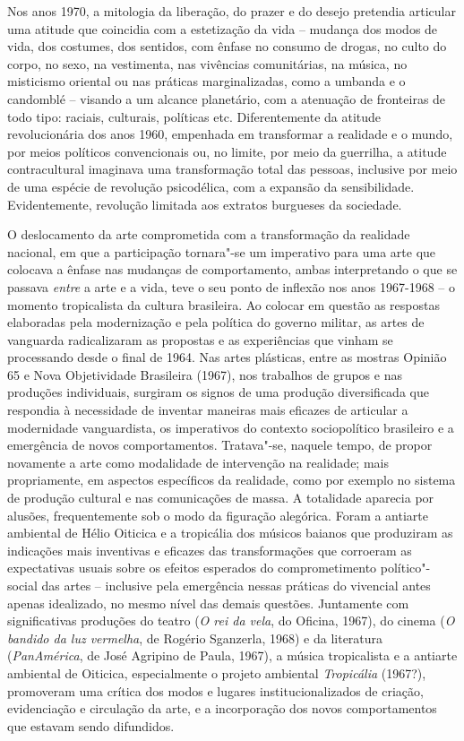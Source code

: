 Nos anos 1970, a mitologia da liberação, do prazer e do desejo pretendia
articular uma atitude que coincidia com a estetização da vida -- mudança
dos modos de vida, dos costumes, dos sentidos, com ênfase no consumo de
drogas, no culto do corpo, no sexo, na vestimenta, nas vivências
comunitárias, na música, no misticismo oriental ou nas práticas
marginalizadas, como a umbanda e o candomblé -- visando a um alcance
planetário, com a atenuação de fronteiras de todo tipo: raciais,
culturais, políticas etc. Diferentemente da atitude revolucionária dos
anos 1960, empenhada em transformar a realidade e o mundo, por meios
políticos convencionais ou, no limite, por meio da guerrilha, a atitude
contracultural imaginava uma transformação total das pessoas, inclusive
por meio de uma espécie de revolução psicodélica, com a expansão da
sensibilidade. Evidentemente, revolução limitada aos extratos burgueses
da sociedade.

O deslocamento da arte comprometida com a transformação da realidade
nacional, em que a participação tornara"-se um imperativo para uma arte
que colocava a ênfase nas mudanças de comportamento, ambas interpretando
o que se passava \emph{entre} a arte e a vida, teve o seu ponto de
inflexão nos anos 1967-1968 -- o momento tropicalista da cultura
brasileira. Ao colocar em questão as respostas elaboradas pela
modernização e pela política do governo militar, as artes de vanguarda
radicalizaram as propostas e as experiências que vinham se processando
desde o final de 1964. Nas artes plásticas, entre as mostras Opinião 65
e Nova Objetividade Brasileira (1967), nos trabalhos de grupos e nas
produções individuais, surgiram os signos de uma produção diversificada
que respondia à necessidade de inventar maneiras mais eficazes de
articular a modernidade vanguardista, os imperativos do contexto
sociopolítico brasileiro e a emergência de novos comportamentos.
Tratava"-se, naquele tempo, de propor novamente a arte como modalidade de
intervenção na realidade; mais propriamente, em aspectos específicos da
realidade, como por exemplo no sistema de produção cultural e nas
comunicações de massa. A totalidade aparecia por alusões, frequentemente
sob o modo da figuração alegórica. Foram a antiarte ambiental de Hélio
Oiticica e a tropicália dos músicos baianos que produziram as indicações
mais inventivas e eficazes das transformações que corroeram as
expectativas usuais sobre os efeitos esperados do comprometimento
político"-social das artes -- inclusive pela emergência nessas práticas
do vivencial antes apenas idealizado, no mesmo nível das demais
questões. Juntamente com significativas produções do teatro (\emph{O rei
da vela}, do Oficina, 1967), do cinema (\emph{O bandido da luz
vermelha}, de Rogério Sganzerla, 1968) e da literatura
(\emph{PanAmérica}, de José Agripino de Paula, 1967), a música
tropicalista e a antiarte ambiental de Oiticica, especialmente o projeto
ambiental \emph{Tropicália} (1967?), promoveram uma crítica dos modos e
lugares institucionalizados de criação, evidenciação e circulação da
arte, e a incorporação dos novos comportamentos que estavam sendo
difundidos.

